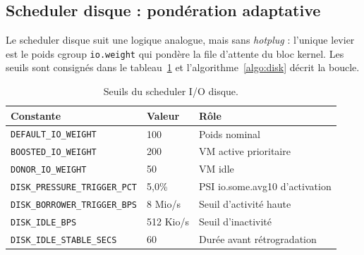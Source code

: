 \subsection{Scheduler disque : pondération adaptative}

Le scheduler disque suit une logique analogue, mais sans \emph{hotplug} : l'unique levier est le poids cgroup \texttt{io.weight} qui pondère la file d'attente du bloc kernel. Les seuils sont consignés dans le tableau~\ref{tab:disk-seuils} et l'algorithme~\ref{algo:disk} décrit la boucle.

\begin{table}[H]
\centering
\small
\caption{Seuils du scheduler I/O disque.}
\begin{tabular}{llp{6.0cm}}
\toprule
\textbf{Constante} & \textbf{Valeur} & \textbf{Rôle} \\
\midrule
\texttt{DEFAULT\_IO\_WEIGHT}        & 100        & Poids nominal \\
\texttt{BOOSTED\_IO\_WEIGHT}        & 200        & VM active prioritaire \\
\texttt{DONOR\_IO\_WEIGHT}          & 50         & VM idle \\
\texttt{DISK\_PRESSURE\_TRIGGER\_PCT} & 5,0\%    & PSI io.some.avg10 d'activation \\
\texttt{DISK\_BORROWER\_TRIGGER\_BPS} & 8 Mio/s  & Seuil d'activité haute \\
\texttt{DISK\_IDLE\_BPS}            & 512 Kio/s  & Seuil d'inactivité \\
\texttt{DISK\_IDLE\_STABLE\_SECS}   & 60         & Durée avant rétrogradation \\
\bottomrule
\end{tabular}

\label{tab:disk-seuils}
\end{table}

\begin{algorithm}[H]
\caption{Boucle d'arbitrage I/O (\texttt{DiskIoScheduler::tick})}
\label{algo:disk}
\end{algorithm}

